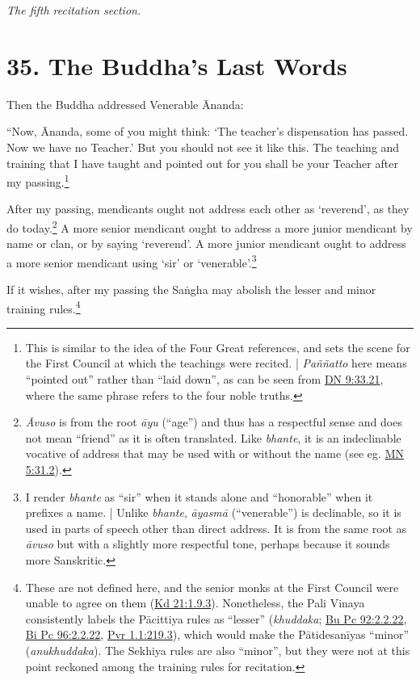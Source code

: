 \documentclass[12pt,openany]{book}%
\newcommand*{\scendsection}[1]{\begin{Center}\begin{small}\textit{#1}\end{small}\end{Center}\addvspace{1em}}
\begin{document}
\scendsection{The fifth recitation section. }

\section*{35. The Buddha’s Last Words }

Then the Buddha addressed Venerable Ānanda: 

“Now, Ānanda, some of you might think: ‘The teacher’s dispensation has passed. Now we have no Teacher.’ But you should not see it like this. The teaching and training that I have taught and pointed out for you shall be your Teacher after my passing.\footnote{This is similar to the idea of the Four Great references, and sets the scene for the First Council at which the teachings were recited. | \textit{\textsanskrit{Paññatto}} here means “pointed out” rather than “laid down”, as can be seen from \href{https://suttacentral.net/dn9/en/sujato\#33.21}{DN 9:33.21}, where the same phrase refers to the four noble truths. } 

After my passing, mendicants ought not address each other as ‘reverend’, as they do today.\footnote{\textit{Āvuso} is from the root \textit{\textsanskrit{āyu}} (“age”) and thus has a respectful sense and does not mean “friend” as it is often translated. Like \textit{bhante}, it is an indeclinable vocative of address that may be used with or without the name (see eg. \href{https://suttacentral.net/mn5/en/sujato\#31.2}{MN 5:31.2}). } A more senior mendicant ought to address a more junior mendicant by name or clan, or by saying ‘reverend’. A more junior mendicant ought to address a more senior mendicant using ‘sir’ or ‘venerable’.\footnote{I render \textit{bhante} as “sir” when it stands alone and “honorable” when it prefixes a name. | Unlike \textit{bhante}, \textit{\textsanskrit{āyasmā}} (“venerable”) is declinable, so it is used in parts of speech other than direct address. It is from the same root as \textit{\textsanskrit{āvuso}} but with a slightly more respectful tone, perhaps because it sounds more Sanskritic. } 

If it wishes, after my passing the \textsanskrit{Saṅgha} may abolish the lesser and minor training rules.\footnote{These are not defined here, and the senior monks at the First Council were unable to agree on them (\href{https://suttacentral.net/pli-tv-kd21/en/sujato\#1.9.3}{Kd 21:1.9.3}). Nonetheless, the Pali Vinaya consistently labels the \textsanskrit{Pācittiya} rules as “lesser” (\textit{khuddaka}; \href{https://suttacentral.net/pli-tv-bu-vb-pc92/en/sujato\#2.2.22}{Bu Pc 92:2.2.22}, \href{https://suttacentral.net/pli-tv-bi-vb-pc96/en/sujato\#2.2.22}{Bi Pc 96:2.2.22}, \href{https://suttacentral.net/pli-tv-pvr1.1/en/sujato\#219.3}{Pvr 1.1:219.3}), which would make the \textsanskrit{Pātidesanīyas} “minor” (\textit{anukhuddaka}). The Sekhiya rules are also “minor”, but they were not at this point reckoned among the training rules for recitation. } 
\end{document}
